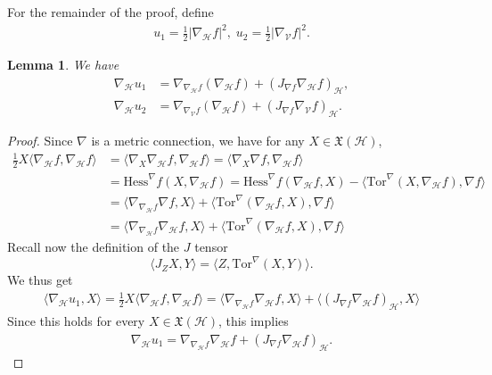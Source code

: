 \documentclass[11pt]{article}
\numberwithin{equation}{section}
\newtheorem{lemma}[theorem]{Lemma}
\newcommand{\abs}[1]{\left|#1\right|}     %
\newcommand{\Ho}{\mathcal H}
\newcommand{\Tor}{\mathrm{Tor}}
\begin{document}
	For the remainder of the proof, define 
	\begin{align*}
		u_1=\frac{1}{2}\abs{\nabla_{\mathcal{H}} f}^2,\; u_2=\frac{1}{2}\abs{\nabla_{\mathcal{V}} f}^2.
	\end{align*}
	\begin{lemma}\label{horizontal-part-grad}
		We have
		\begin{align*}
			\nabla_{\mathcal{H}}u_1&=\nabla_{\nabla_\mathcal{H}f} (\nabla_\mathcal{H}f)+(J_{\nabla f}\nabla_\mathcal{H}f)_{\mathcal{H}},\\
			\nabla_{\mathcal{H}}u_2&=\nabla_{\nabla_\mathcal{V}f} (\nabla_\mathcal{H}f)+(J_{\nabla  f}\nabla_\mathcal{V}f)_{\mathcal{H}}.
		\end{align*}
	\end{lemma}
	\begin{proof}
		Since $\nabla$ is a metric connection, we have for any $X\in \mathfrak{X}(\mathcal{H})$,
		\begin{align*}
			\frac{1}{2}X\langle \nabla_\mathcal{H}f, \nabla_\mathcal{H}f\rangle&= \langle \nabla_X \nabla_\mathcal{H}f ,\nabla_\mathcal{H}f\rangle=\langle \nabla_X \nabla f ,\nabla_\mathcal{H}f\rangle\\
			&=\mathrm{Hess}^{\nabla}f(X, \nabla_{\mathcal{H}} f)=\mathrm{Hess}^{\nabla}f( \nabla_{\mathcal{H}} f, X)-\langle \mathrm{Tor}^{\nabla}(X, \nabla_{\mathcal{H}} f),\nabla f\rangle \\
			&=\langle \nabla_{\nabla_\mathcal{H}f} \nabla f , X\rangle+\langle \mathrm{Tor}^{\nabla}( \nabla_{\mathcal{H}} f, X),\nabla f\rangle \\
			&=\langle \nabla_{\nabla_\mathcal{H}f} \nabla_\Ho f , X\rangle+\langle \mathrm{Tor}^{\nabla}( \nabla_{\mathcal{H}} f, X),\nabla f\rangle
		\end{align*}
		Recall now the definition of the $J$ tensor
		\[ \langle J_ZX, Y \rangle=\langle Z, \Tor^\nabla (X,Y) \rangle.   \]
		We thus get
		\begin{align*}
			\langle \nabla_{\mathcal{H}} u_1, X \rangle=\frac{1}{2}X\langle \nabla_\mathcal{H}f, \nabla_\mathcal{H}f\rangle=\langle \nabla_{\nabla_\mathcal{H}f} \nabla_\mathcal{H} f , X\rangle+\langle (J_{\nabla f}\nabla_\mathcal{H}f)_{\mathcal{H}} , X \rangle
		\end{align*}
		Since this holds for every $X \in \mathfrak{X}(\Ho)$, this implies
		\begin{align*}
			\nabla_{\mathcal{H}}u_1=\nabla_{\nabla_\mathcal{H}f} \nabla_\mathcal{H}f+(J_{\nabla f}\nabla_\mathcal{H}f)_{\mathcal{H}}.
		\end{align*}

\end{proof}
\end{document}
